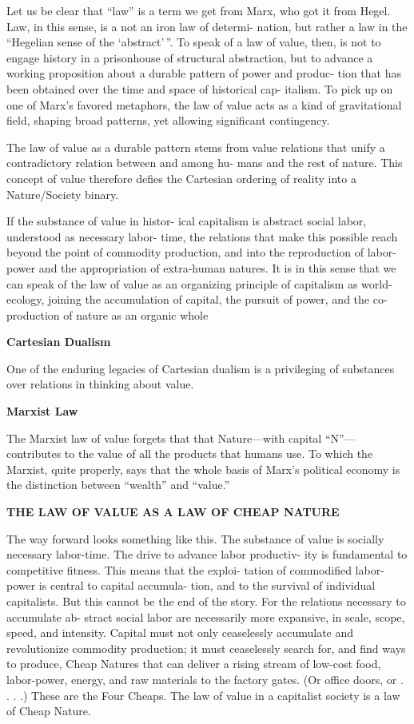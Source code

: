 \documentclass[
]{book}
\begin{document}
Let us be clear that ``law'' is a term we get from Marx, who
got it from Hegel. Law, in this sense, is a not an iron law of determi-
nation, but rather a law in the ``Hegelian sense of the `abstract'\,''.
To speak of a law of value, then, is not to engage
history in a prisonhouse of structural abstraction, but to advance a
working proposition about a durable pattern of power and produc-
tion that has been obtained over the time and space of historical cap-
italism. To pick up on one of Marx's favored metaphors, the law of
value acts as a kind of gravitational field, shaping broad patterns, yet
allowing significant contingency.

The law of value as a durable pattern stems from value
relations that unify a contradictory relation between and among hu-
mans and the rest of nature. This concept of value therefore defies
the Cartesian ordering of reality into a Nature/Society binary.

If the substance of value in histor-
ical capitalism is abstract social labor, understood as necessary labor-
time, the relations that make this possible reach beyond the point of
commodity production, and into the reproduction of labor-power
and the appropriation of extra-human natures.
It is in this sense that
we can speak of the law of value as an organizing principle of capitalism
as world-ecology, joining the accumulation of capital, the pursuit
of power, and the co-production of nature as an organic whole

\textbf{Cartesian Dualism}

One of the enduring legacies of Cartesian dualism is a
privileging of substances over relations in thinking about value.

\textbf{Marxist Law}

The Marxist law of value forgets that that Nature---with capital ``N''---contributes to the
value of all the products that humans use. To which the Marxist, quite
properly, says that the whole basis of Marx's political economy is the
distinction between ``wealth'' and ``value.''

\textbf{THE LAW OF VALUE AS A LAW OF CHEAP NATURE}

The way forward looks something like this. The substance of value
is socially necessary labor-time. The drive to advance labor productiv-
ity is fundamental to competitive fitness. This means that the exploi-
tation of commodified labor-power is central to capital accumula-
tion, and to the survival of individual capitalists. But this cannot be
the end of the story. For the relations necessary to accumulate ab-
stract social labor are necessarily more expansive, in scale, scope,
speed, and intensity. Capital must not only ceaselessly accumulate
and revolutionize commodity production; it must ceaselessly search
for, and find ways to produce, Cheap Natures that can deliver a rising
stream of low-cost food, labor-power, energy, and raw materials to the
factory gates. (Or office doors, or . . . .) These are the Four Cheaps.
The law of value in a capitalist society is a law of Cheap Nature.
\end{document}
